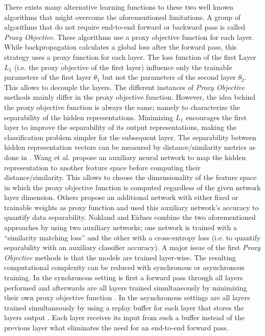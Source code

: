 There exists many alternative learning functions to these two well known algorithms that might overcome the aforementioned limitations.
A group of algorithms that do not require end-to-end forward or backward pass is called \emph{Proxy Objective}.
These algorithms use a proxy objective function for each layer.
While backpropagation calculates a global loss after the forward pass, this strategy uses a proxy function for each layer.
The loss function of the first Layer $L_1$ (i.e. the proxy objective of the first layer) influence only the trainable parameters of the first layer $\theta_1$ but not the parameters of the second layer $\theta_2$.
This allows to decouple the layers.
The different instances of \emph{Proxy Objective} methods mainly differ in the proxy objective function.
However, the idea behind the proxy objective function is always the same; namely to characterize the separability of the hidden representations.
Minimizing $L_1$ encourages the first layer to improve the separability of its output representations, making the classification problem simpler for the subsequent layer.
The separability between hidden representation vectors can be measured by distance/similarity metrics as done in .
Wang et al.  propose an auxiliary neural network to map the hidden representation to another feature space before computing their distance/similarity.
This allows to choose the dimensionality of the feature space in which the proxy objective function is computed regardless of the given network layer dimension.
Others  propose an additional network with either fixed or trainable weights as proxy function and used this auxiliary network's accuracy to quantify data separability.
Nokland and Eidnes  combine the two aforementioned approaches by using two auxiliary networks; one network is trained with a ``similarity matching loss'' and the other with a cross-entropy loss (i.e. to quantify separability with an auxiliary classifier accuracy).
A major issue of the first \emph{Proxy Objective} methods is that the models are trained layer-wise.
The resulting computational complexity can be reduced with synchronous or asynchronous training.
In the synchronous setting is first a forward pass through all layers performed and afterwards are all layers trained simultaneously by minimizing their own proxy objective function \cite{belilovsky2019greedy}.
In the asynchronous settings are all layers trained simultaneously by using a replay buffer for each layer that stores the layers output .
Each layer receives its input from such a buffer instead of the previous layer what eliminates the need for an end-to-end forward pass.

